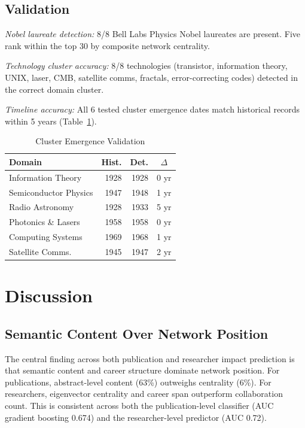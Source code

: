 \documentclass[journal]{IEEEtran}
\begin{document}
\subsection{Validation}

\textit{Nobel laureate detection:} 8/8 Bell Labs Physics Nobel laureates are
present. Five rank within the top 30 by composite network centrality.

\textit{Technology cluster accuracy:} 8/8 technologies (transistor, information
theory, UNIX, laser, CMB, satellite comms, fractals, error-correcting codes)
detected in the correct domain cluster.

\textit{Timeline accuracy:} All 6 tested cluster emergence dates match
historical records within 5 years (Table~\ref{tab:timeline}).

\begin{table}[htbp]
\caption{Cluster Emergence Validation}
\label{tab:timeline}
\centering
\begin{tabular}{lrrc}
\toprule
\textbf{Domain} & \textbf{Hist.} & \textbf{Det.} & \textbf{$\Delta$} \\
\midrule
Information Theory    & 1928 & 1928 & 0 yr \\
Semiconductor Physics & 1947 & 1948 & 1 yr \\
Radio Astronomy       & 1928 & 1933 & 5 yr \\
Photonics \& Lasers   & 1958 & 1958 & 0 yr \\
Computing Systems     & 1969 & 1968 & 1 yr \\
Satellite Comms.      & 1945 & 1947 & 2 yr \\
\bottomrule
\end{tabular}
\end{table}


\section{Discussion}
\label{sec:discussion}

\subsection{Semantic Content Over Network Position}
The central finding across both publication and researcher impact prediction
is that semantic content and career structure dominate network position.
For publications, abstract-level content (63\%) outweighs centrality (6\%).
For researchers, eigenvector centrality and career span outperform collaboration
count. This is consistent across both the publication-level classifier (AUC
gradient boosting 0.674) and the researcher-level predictor (AUC 0.72).
\end{document}
